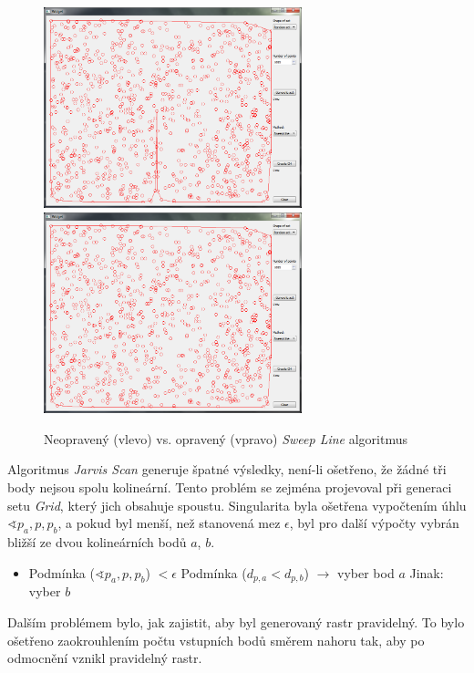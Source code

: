 \documentclass[a4paper, 12pt]{article}
\begin{document}
\begin{figure} [h!]
    \centering
      \includegraphics[width=7.5cm]{./pictures/app_sweep_wrong.png}
      \includegraphics[width=7.5cm]{./pictures/app_sweep_right.png}
      \caption{Neopravený (vlevo) vs. opravený (vpravo) \textit{Sweep Line} algoritmus}
\end{figure}

Algoritmus \textit{Jarvis Scan} generuje špatné výsledky, není-li ošetřeno, že žádné tři body nejsou spolu kolineární. Tento problém se zejména projevoval při generaci setu \textit{Grid}, který jich obsahuje spoustu. Singularita byla ošetřena vypočtením úhlu $\sphericalangle p_{a}, p, p_{b}$, a pokud byl menší, než stanovená mez $\epsilon$, byl pro další výpočty vybrán bližší ze dvou kolineárních bodů $a$, $b$.

\begin{itemize}
\item Podmínka ($\sphericalangle p_{a}, p, p_{b}$) $< \epsilon$
\subitem Podmínka ($d_{p,a} < d_{p,b}$) $\rightarrow$ vyber bod $a$
\subitem Jinak: vyber $b$
\end{itemize}

Dalším problémem bylo, jak zajistit, aby byl generovaný rastr pravidelný. To bylo ošetřeno zaokrouhlením počtu vstupních bodů směrem nahoru tak, aby po odmocnění vznikl pravidelný rastr.\\
\end{document}
